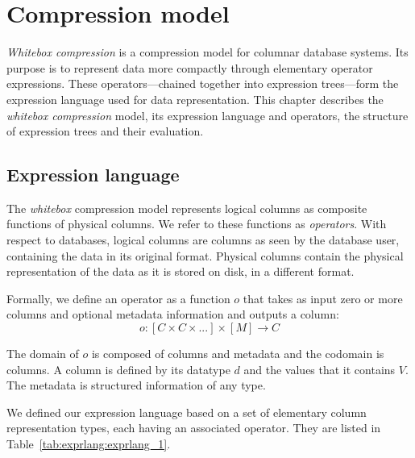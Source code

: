 
\chapter{Compression model}
\label{ch:exprlang}



\graphicspath{{4_expression_language/images/}}

% 

\textit{Whitebox compression} is a compression model for columnar database systems. Its purpose is to represent data more compactly through elementary operator expressions. These operators---chained together into expression trees---form the expression language used for data representation. This chapter describes the \textit{whitebox compression} model, its expression language and operators, the structure of expression trees and their evaluation.

\section{Expression language}
\label{sec:exprlang:exprlang}

The \textit{whitebox} compression model represents logical columns as composite functions of physical columns. We refer to these functions as \textit{operators}. With respect to databases, logical columns are columns as seen by the database user, containing the data in its original format. Physical columns contain the physical representation of the data as it is stored on disk, in a different format.

Formally, we define an operator as a function \(o\) that takes as input zero or more columns and optional metadata information and outputs a column: 
\begin{equation}
\label{eq:exprlang:exprlang:operator}
    o \colon [C \times C \times ...] \times [M] \to C
\end{equation}

The domain of \(o\) is composed of columns and metadata and the codomain is columns. A column is defined by its datatype \(d\) and the values that it contains \(V\). The metadata is structured information of any type.

We defined our expression language based on a set of elementary column representation types, each having an associated operator. They are listed in Table~\ref{tab:exprlang:exprlang_1}.

